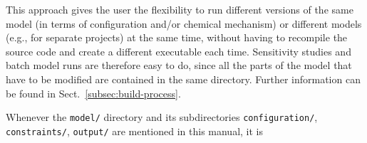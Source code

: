 This approach gives the user the flexibility to run different versions
of the same model (in terms of configuration and/or chemical
mechanism) or different models (e.g., for separate projects) at the
same time, without having to recompile the source code and create a
different executable each time. Sensitivity studies and batch model
runs are therefore easy to do, since all the parts of the model that
have to be modified are contained in the same directory. Further
information can be found in Sect.~\ref{subsec:build-process}.

Whenever the \texttt{model/} directory and its subdirectories
\texttt{configuration/}, \texttt{constraints/}, \texttt{output/} are
mentioned in this manual, it is  
